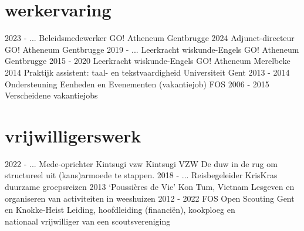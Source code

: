 \documentclass[]{friggeri-cv}
\begin{document}
\section{werkervaring}
\vspace{-0.2cm}
\begin{entrylist}
  \vspace{-2.5mm}
  \entry
    {2023 - ...}
    {Beleidsmedewerker}
    {GO! Atheneum Gentbrugge}
    {}
  \vspace{-2.5mm}
  \entry
    {2024}
    {Adjunct-directeur}
    {GO! Atheneum Gentbrugge}
    {}
  \vspace{-2.5mm}
  \entry
    {2019 - ...}
    {Leerkracht wiskunde-Engels}
    {GO! Atheneum Gentbrugge}
    {}
  \vspace{-2.5mm}
  \entry
    {2015 - 2020}
    {Leerkracht wiskunde-Engels}
    {GO! Atheneum Merelbeke}
    {}
  \vspace{-2.5mm}
  \entry
    {2014}
    {Praktijk assistent: taal- en tekstvaardigheid}
    {Universiteit Gent}
    {}
  \vspace{-2.5mm}
  \entry
    {2013 - 2014}
    {Ondersteuning Eenheden en Evenementen (vakantiejob)}
    {FOS}
    {}
  \vspace{-2.5mm}
  \entry
    {2006 - 2015}
    {Verscheidene vakantiejobs}
    {}
    {}
\end{entrylist}

\vspace{-0.15cm}
\section{vrijwilligerswerk}
\vspace{-0.2cm}
\begin{entrylist}
    \entry
    {2022 - ...}
    {Mede-oprichter Kintsugi vzw}
    {Kintsugi VZW}
    {De duw in de rug om structureel uit (kans)armoede te stappen.}
    \entry
    {2018 - ...}
    {Reisbegeleider}
    {KrisKras}
    {duurzame groepsreizen}
    \entry
    {2013 }
    {‘Poussi\`eres de Vie’}
    {Kon Tum, Vietnam}
    {Lesgeven en organiseren van activiteiten in weeshuizen}
    \entry
    {2012 - 2022}
    {FOS Open Scouting}
    {Gent en Knokke-Heist}
    {Leiding, hoofdleiding (financi\"en), kookploeg en \\ nationaal vrijwilliger van een scoutsvereniging}
\end{entrylist}
\end{document}
